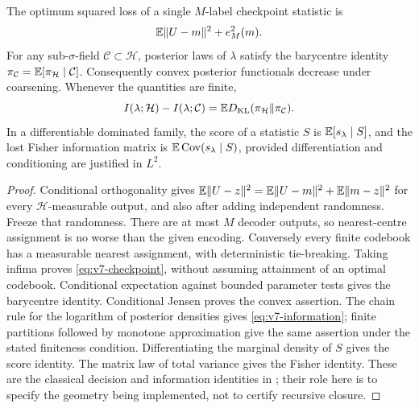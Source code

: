 \begin{proposition}
\label{prop:v7-bayes}
The optimum squared loss of a single $M$-label checkpoint statistic is
\begin{equation}
 \mathbb E\|U-m\|^2+e_M^2(m).                                  \label{eq:v7-checkpoint}
\end{equation}
For any sub-$\sigma$-field $\mathcal C\subset\mathcal H$, posterior laws of $\lambda$
satisfy the barycentre identity
$\pi_{\mathcal C}=\mathbb E[\pi_{\mathcal H}\mid\mathcal C]$.
Consequently convex posterior functionals decrease under coarsening.
Whenever the quantities are finite,
\begin{equation}
 I(\lambda;\mathcal H)-I(\lambda;\mathcal C)
 =\mathbb E D_{\rm KL}(\pi_{\mathcal H}\Vert\pi_{\mathcal C}).   \label{eq:v7-information}
\end{equation}
In a differentiable dominated family, the score of a statistic $S$ is
$\mathbb E[s_\lambda\mid S]$, and the lost Fisher information matrix is
$\mathbb E\operatorname{Cov}(s_\lambda\mid S)$, provided differentiation and conditioning
are justified in $L^2$.
\end{proposition}
\begin{proof}
Conditional orthogonality gives
$\mathbb E\|U-z\|^2=\mathbb E\|U-m\|^2+\mathbb E\|m-z\|^2$ for every
$\mathcal H$-measurable output, and also after adding independent
randomness. Freeze that randomness. There are at most $M$ decoder
outputs, so nearest-centre assignment is no worse than the given
encoding. Conversely every finite codebook has a measurable nearest
assignment, with deterministic tie-breaking. Taking infima proves
\eqref{eq:v7-checkpoint}, without assuming attainment of an optimal
codebook. Conditional expectation against bounded parameter tests gives
the barycentre identity. Conditional Jensen proves the convex assertion.
The chain rule for the logarithm of posterior densities gives
\eqref{eq:v7-information}; finite partitions followed by monotone
approximation give the same assertion under the stated finiteness
condition. Differentiating the marginal density of $S$ gives the score
identity. The matrix law of total variance gives the Fisher identity.
These are the classical decision and information identities in
\cite{Blackwell1953,LeCamYang2000}; their role here is to specify the
geometry being implemented, not to certify recursive closure.
\end{proof}

